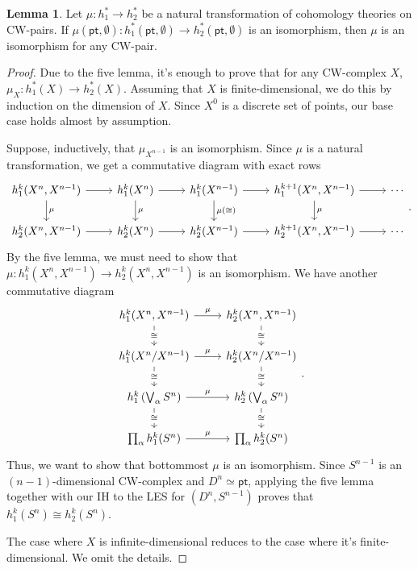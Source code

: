 \documentclass[10pt,letterpaper,cm]{nupset}
\theoremstyle{definition}
\theoremstyle{theorem}
\newtheorem{lemma}[definition]{Lemma}
\theoremstyle{remark}
\newcommand{\1}{\mathbb{1}}
\newcommand{\0}{\vec 0}
\newcommand{\pt}{\mathsf{pt}}
\begin{document}
\begin{lemma}
Let $\mu : h^{\ast}_1 \to h^{\ast}_2$ be a natural transformation of cohomology theories on CW-pairs. If $\mu(\pt, \emptyset) : h_1^{\ast}(\pt, \emptyset) \to h_2^{\ast}(\pt, \emptyset)$ is an isomorphism, then $\mu$ is an isomorphism for any CW-pair.
\end{lemma}
\begin{proof}
Due to the five lemma, it's enough to prove that for any CW-complex $X$, $\mu_X : h_1^{\ast}(X) \to h_2^{\ast}(X)$. Assuming that $X$ is finite-dimensional, we do this by induction on the dimension of $X$. Since $X^0$ is a discrete set of points, our base case holds almost by assumption.  

\medskip

 Suppose, inductively, that $\mu_{X^{n-1}}$ is an isomorphism. Since $\mu$ is a natural transformation, we get a commutative diagram with exact rows
\[
\begin{tikzcd}
{h_1^k(X^n, X^{n-1})} \arrow[r] \arrow[d, "\mu"] & h_1^k(X^n) \arrow[r] \arrow[d, "\mu"] & h_1^k(X^{n-1}) \arrow[r] \arrow[d, "\mu(\cong)"] & {h_1^{k+1}(X^n, X^{n-1})} \arrow[r] \arrow[d, "\mu"] & \cdots \\
{h_2^k(X^n, X^{n-1})} \arrow[r]                  & h_2^k(X^n) \arrow[r]                  & h_2^k(X^{n-1}) \arrow[r]                         & {h_2^{k+1}(X^n, X^{n-1})} \arrow[r]                  & \cdots
\end{tikzcd}.
\] By the five lemma, we must need to show that $\mu : h_1^k(X^n, X^{n-1}) \to h_2^k(X^n, X^{n-1})$ is an isomorphism. We have another commutative diagram
\[
\begin{tikzcd}
{h_1^k(X^n, X^{n-1})} \arrow[d, "\cong" description] \arrow[r, "\mu"]       & {h_2^k(X^n, X^{n-1})} \arrow[d, "\cong" description]       \\
h_1^k(X^n/X^{n-1}) \arrow[d, "\cong" description] \arrow[r, "\mu"]          & h_2^k(X^n/X^{n-1}) \arrow[d, "\cong" description]          \\
h_1^k\left(\bigvee_{\alpha} S^n\right) \arrow[d, "\cong" description] \arrow[r, "\mu"] & h_2^k\left(\bigvee_{\alpha} S^n\right) \arrow[d, "\cong" description] \\
\prod_{\alpha}h_1^k(S^n) \arrow[r, "\mu"]                                   & \prod_{\alpha}h_2^k(S^n)                                  
\end{tikzcd}
.\] Thus, we want to show that bottommost $\mu$ is an isomorphism. Since $S^{n-1}$ is an $\left(n-1\right)$-dimensional CW-complex and $D^n \simeq \pt$, applying the five lemma together with our IH to the LES for $\left(D^n, S^{n-1}\right)$ proves that $h_1^k(S^n) \cong h_2^k(S^n)$.

\medskip

 The case where $X$ is infinite-dimensional reduces to the case where it's finite-dimensional. We omit the details. 
\end{proof}
\end{document}
